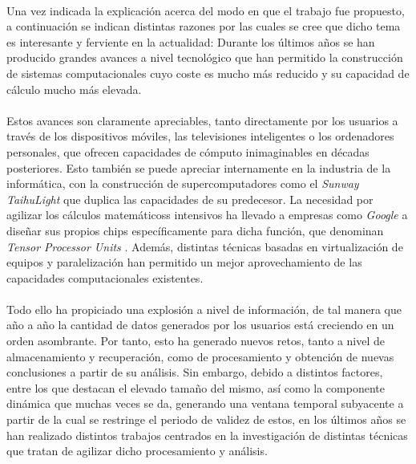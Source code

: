\documentclass{subfiles}
\begin{document}
      \paragraph{}
      Una vez indicada la explicación acerca del modo en que el trabajo fue propuesto, a continuación se indican distintas razones por las cuales se cree que dicho tema es interesante y ferviente en la actualidad: Durante los últimos años se han producido grandes avances a nivel tecnológico que han permitido la construcción de sistemas computacionales cuyo coste es mucho más reducido y su capacidad de cálculo mucho más elevada.

      \paragraph{}
      Estos avances son claramente apreciables, tanto directamente por los usuarios a través de los dispositivos móviles, las televisiones inteligentes o los ordenadores personales, que ofrecen capacidades de cómputo inimaginables en décadas posteriores. Esto también se puede apreciar internamente en la industria de la informática, con la construcción de supercomputadores como el \emph{Sunway TaihuLight} que duplica las capacidades de su predecesor. La necesidad por agilizar los cálculos matemáticoss intensivos ha llevado a empresas como \emph{Google} a diseñar sus propios chips específicamente para dicha función, que denominan \emph{Tensor Processor Units} \cite{jouppi2017datacenter}. Además, distintas técnicas basadas en virtualización de equipos y paralelización han permitido un mejor aprovechamiento de las capacidades computacionales existentes.

      \paragraph{}
      Todo ello ha propiciado una explosión a nivel de información, de tal manera que año a año la cantidad de datos generados por los usuarios está creciendo en un orden asombrante. Por tanto, esto ha generado nuevos retos, tanto a nivel de almacenamiento y recuperación, como de procesamiento y obtención de nuevas conclusiones a partir de su análisis. Sin embargo, debido a distintos factores, entre los que destacan el elevado tamaño del mismo, así como la componente dinámica que muchas veces se da, generando una ventana temporal subyacente a partir de la cual se restringe el periodo de validez de estos, en los últimos años se han realizado distintos trabajos centrados en la investigación de distintas técnicas que tratan de agilizar dicho procesamiento y análisis.
\end{document}
